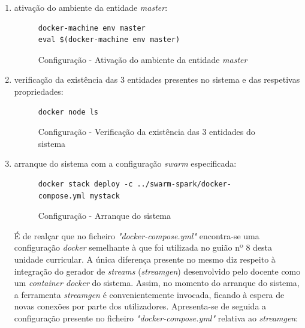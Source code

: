 \documentclass[a4paper]{report}
\begin{document}
{\begin{enumerate}[label=\textbf{\arabic*.}]
            \item ativação do ambiente da entidade \textsl{master}:
            \begin{figure}[H]
                \centering
                \begin{verbatim}
docker-machine env master
eval $(docker-machine env master)
                \end{verbatim}
                \caption{Configuração - Ativação do ambiente da entidade \textsl{master}}
                \label{fig:7}
            \end{figure}

            \item verificação da existência das 3 entidades presentes no sistema e das respetivas propriedades:
            \begin{figure}[H]
                \centering
                \begin{verbatim}
docker node ls
                \end{verbatim}
                \caption{Configuração - Verificação da existência das 3 entidades do sistema}
                \label{fig:8}
            \end{figure}

            \item arranque do sistema com a configuração \textit{swarm} especificada:
            \begin{figure}[H]
                \centering
                \begin{verbatim}
docker stack deploy -c ../swarm-spark/docker-compose.yml mystack
                \end{verbatim}
                \caption{Configuração - Arranque do sistema}
                \label{fig:9}
            \end{figure}

            É de realçar que no ficheiro \textit{"docker-compose.yml"} encontra-se uma configuração \textit{docker} semelhante à que foi utilizada no guião nº 8 desta unidade curricular.
            A única diferença presente no mesmo diz respeito à integração do gerador de \textit{streams} (\textit{streamgen}) desenvolvido pelo docente como um \textit{container docker} do sistema.
            Assim, no momento do arranque do sistema, a ferramenta \textit{streamgen} é convenientemente invocada, ficando à espera de novas conexões por parte dos utilizadores.
            Apresenta-se de seguida a configuração presente no ficheiro \textit{"docker-compose.yml"} relativa ao \textit{streamgen}:


\end{enumerate}}
\end{document}
